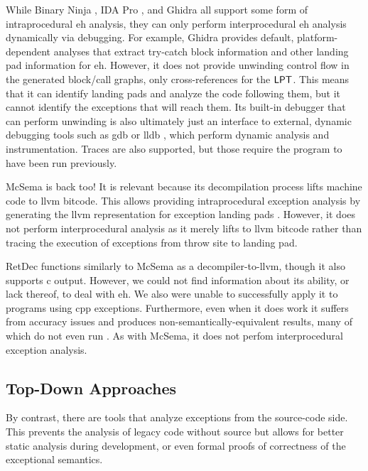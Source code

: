 While Binary Ninja \autocite{binary-ninja}, IDA Pro \autocite{ida}, and Ghidra \autocite{ghidra} all support some form of intraprocedural \gls{eh} analysis, they can only perform interprocedural \gls{eh} analysis dynamically via debugging.
For example, Ghidra provides default, platform-dependent analyses that extract try-catch block information and other landing pad information for \gls{eh}.
However, it does not provide unwinding control flow in the generated block/call graphs, only cross-references for the $\operatorname{\mathsf{LPT}}$.
This means that it can identify landing pads and analyze the code following them, but it cannot identify the exceptions that will reach them.
Its built-in debugger that can perform unwinding is also ultimately just an interface to external, dynamic debugging tools such as \gls{gdb} or \gls{lldb} \autocite{lldb},
which perform dynamic analysis and instrumentation. Traces are also supported,
but those require the program to have been run previously.

McSema \autocite{mcsema} is back too! It is relevant because its decompilation process lifts machine code to \gls{llvm} bitcode.
This allows providing intraprocedural exception analysis by generating the \gls{llvm} representation for exception landing pads \autocite{mcsema-exceptions}.
However, it does not perform interprocedural analysis as it merely lifts to \gls{llvm} bitcode rather than tracing the execution of exceptions from throw site to landing pad.

RetDec \autocite{retdec} functions similarly to McSema as a decompiler-to-\gls{llvm}, though it also supports \gls{c} output.
However, we could not find information about its ability, or lack thereof, to deal with \gls{eh}. We also were unable to successfully apply it to programs using \gls{cpp} exceptions.
Furthermore, even when it does work it suffers from accuracy issues and produces non-semantically-equivalent results, many of which do not even run \autocite{foudree2019regsym}.
As with McSema, it does not perfom interprocedural exception analysis.

\subsection{Top-Down Approaches}
By contrast, there are tools that analyze exceptions from the source-code side.
This prevents the analysis of legacy code without source but allows for better static analysis during development, or even formal proofs of correctness of the exceptional semantics.

